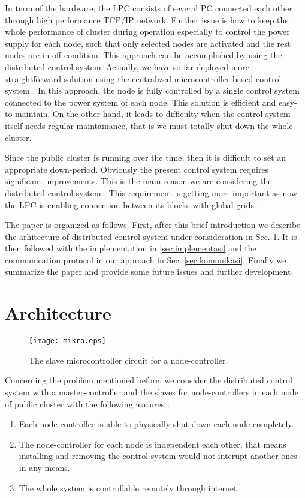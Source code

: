 \documentclass[conference,letterpaper]{IEEEtran}
\begin{document}
In term of the hardware, the LPC consists of several PC connected each other through high performance TCP/IP network. Further issue is how to keep the whole performance of cluster during operation especially to control the power supply for each node, such that only selected nodes are activated and the rest nodes are in off-condition. This approach can be accomplished by using the distributed control system. Actually, we have so far deployed more straightforward solution using the centralized microcontroller-based control system  \cite{kontrol}. In this approach, the node is fully controlled by a single control system connected to the power system of each node. This solution is efficient and easy-to-maintain. On the other hand, it leads to difficulty when the control system itself needs regular maintainance, that is we must totally shut down the whole cluster. 

Since the public cluster is running over the time, then it is difficult to set an appropriate down-period. Obviously the present control system requires significant improvements. This is the main reason we are considering the distributed control system \cite{csang}. This requirement is getting more important as now the LPC is enabling connection between its blocks with global grids \cite{grid}.

The paper is organized as follows. First, after this brief introduction we describe the arhitecture of distributed control system under consideration in Sec. \ref{sec:arsitektur}. It is then followed with the implementation in \ref{sec:implementasi} and the communication protocol in our approach in Sec. \ref{sec:komunikasi}. Finally we summarize the paper and provide some future issues and further development.

\section{Architecture}
\label{sec:arsitektur}

\begin{figure*}[t]
 \centering
 \texttt{[image: mikro.eps]}
 \caption{The slave microcontroller circuit for a node-controller.}
 \label{fig:mikro}
\end{figure*}

Concerning the problem mentioned before, we consider the distributed control system with a master-controller and the slaves for node-controllers in each node of public cluster with the following features :
\begin{enumerate}
\item Each node-controller is able to physically shut down each node completely. 
 \item The node-controller for each node is independent each other, that means installing and removing the control system would not interupt another ones in any means.
\item The whole system is controllable remotely through internet.
\end{enumerate}
\end{document}
